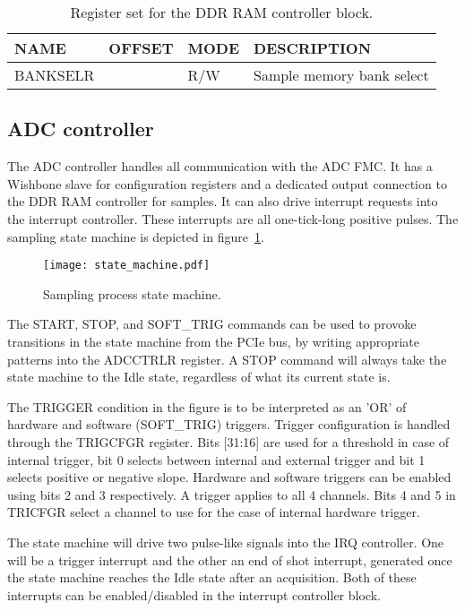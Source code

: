 \documentclass{article}
\begin{document}
\begin{table}[htbp]
  \centering
  \begin{tabularx}{\textwidth}{|l|r|l|X|}
    \hline
    \textbf{NAME} & \textbf{OFFSET} & \textbf{MODE} & \textbf{DESCRIPTION} \\
    \hline
    \hline
    BANKSELR & & R/W & Sample memory bank select\\
    \hline
  \end{tabularx}
  \caption{Register set for the DDR RAM controller block.}
  \label{tab:ddr_control}
\end{table}

\subsection{ADC controller}
The ADC controller handles all communication with the ADC FMC. It has a Wishbone slave for configuration registers and a dedicated output connection to the DDR RAM controller for samples. It can also drive interrupt requests into the interrupt controller. These interrupts are all one-tick-long positive pulses. The sampling state machine is depicted in figure~\ref{fig:state_machine}. 

\begin{figure}[htbp]
  \centering
  \texttt{[image: state\_machine.pdf]}
  \caption{Sampling process state machine.}
  \label{fig:state_machine}
\end{figure}

The START, STOP, and SOFT\_TRIG commands can be used to provoke transitions in the state machine from the PCIe bus, by writing appropriate patterns into the ADCCTRLR register. A STOP command will always take the state machine to the Idle state, regardless of what its current state is. 

The TRIGGER condition in the figure is to be interpreted as an 'OR' of hardware and software (SOFT\_TRIG) triggers. Trigger configuration is handled through the TRIGCFGR register. Bits [31:16] are used for a threshold in case of internal trigger, bit 0 selects between internal and external trigger and bit 1 selects positive or negative slope. Hardware and software triggers can be enabled using bits 2 and 3 respectively. A trigger applies to all 4 channels. Bits 4 and 5 in TRICFGR select a channel to use for the case of internal hardware trigger.  

The state machine will drive two pulse-like signals into the IRQ controller. One will be a trigger interrupt and the other an end of shot interrupt, generated once the state machine reaches the Idle state after an acquisition. Both of these interrupts can be enabled/disabled in the interrupt controller block.
\end{document}
